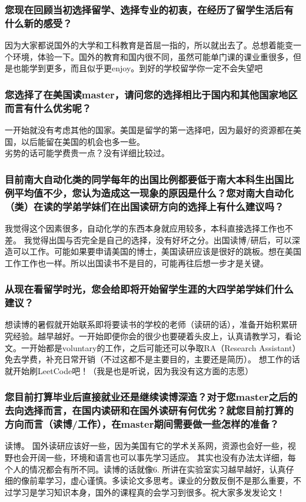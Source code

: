 \documentclass[a4paper,UTF8]{book}
\begin{document}
    \subsubsection*{您现在回顾当初选择留学、选择专业的初衷，在经历了留学生活后有什么新的感受？}
    因为大家都说国外的大学和工科教育是首屈一指的，所以就出去了。总想着能变一个环境，体验一下。国外的教育和国内很不同，虽然可能单门课的课业重很多，但是也能学到更多，而且似乎更enjoy。到好的学校留学你一定不会失望吧

    \subsubsection*{您选择了在美国读master，请问您的选择相比于国内和其他国家地区而言有什么优劣呢？}
    一开始就没有考虑其他的国家。美国是留学的第一选择吧，因为最好的资源都在美国，以后能留在美国的机会也多一些。\\
    劣势的话可能学费贵一点？没有详细比较过。

    \subsubsection*{目前南大自动化类的同学每年的出国比例都要低于南大本科生出国比例平均值不少，您认为造成这一现象的原因是什么？您对南大自动化（类）在读的学弟学妹们在出国读研方向的选择上有什么建议吗？}
    我觉得这个因素很多，自动化学的东西本身就应用较多，本科直接选择工作也不差。
    我觉得出国与否完全是自己的选择，没有好坏之分。出国读博/研后，可以深造可以工作。可能如果要申请美国的博士，美国读研应该是很好的跳板。想在美国工作工作也一样。所以出国读书不是目的，可能再往后想一步才是关键。

    \subsubsection*{从现在看留学时光，您会给即将开始留学生涯的大四学弟学妹们什么建议？}
    想读博的暑假就开始联系即将要读书的学校的老师（读研的话），准备开始积累研究经验。越早越好。一开始即便你会的很少也要硬着头皮上，认真请教学习，看论文。一开始都是voluntary的工作，之后可能还可以争取RA（Research Assistant）免去学费，补充日常开销（不过这都不是主要目的，主要还是简历）。
    想工作的话就开始刷LeetCode吧！（我是也是听说，因为我没有这方面的志愿）

    \subsubsection*{您目前打算毕业后直接就业还是继续读博深造？对于您master之后的去向选择而言，在国内读研和在国外读研有何优劣？就您目前打算的方向而言（读博/工作），在master期间需要做一些怎样的准备？}
    读博。
    国外读研应该好一些，因为美国有它的学术关系网，资源也会好一些，视野也会开阔一些，环境和语言也可以事先学习适应。
    其实也没有办法太详细，每个人的情况都会有所不同。读博的话就像6. 所讲在实验室实习越早越好，认真仔细的像前辈学习，虚心谨慎。多读论文多思考。课业的分数反倒不是那么重要，不过学习是学习知识本身，国外的课程真的会学习到很多。祝大家多发发论文！
\end{document}
